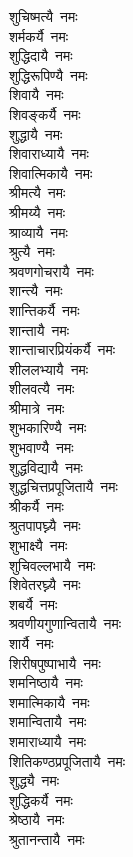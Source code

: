 \begin{flushleft}
\begin{multicols}{2}
शुचिष्मत्यै~नमः\hfill{}\\
शर्मकर्यै~नमः\\
शुद्धिदायै~नमः\\
शुद्धिरूपिण्यै~नमः\\
शिवायै~नमः\\
शिवङ्कर्यै~नमः\\
शुद्धायै~नमः\\
शिवाराध्यायै~नमः\\
शिवात्मिकायै~नमः\\
श्रीमत्यै~नमः\\
श्रीमय्यै~नमः\hfill{}\\
श्राव्यायै~नमः\\
श्रुत्यै~नमः\\
श्रवणगोचरायै~नमः\\
शान्त्यै~नमः\\
शान्तिकर्यै~नमः\\
शान्तायै~नमः\\
शान्ताचारप्रियंकर्यै~नमः\\
शीललभ्यायै~नमः\\
शीलवत्यै~नमः\\
श्रीमात्रे~नमः\hfill{}\\
शुभकारिण्यै~नमः\\
शुभवाण्यै~नमः\\
शुद्धविद्यायै~नमः\\
शुद्धचित्तप्रपूजितायै~नमः\\
श्रीकर्यै~नमः\\
श्रुतपापघ्न्यै~नमः\\
शुभाक्ष्यै~नमः\\
शुचिवल्लभायै~नमः\\
शिवेतरघ्न्यै~नमः\\
शबर्यै~नमः\hfill{}\\
श्रवणीयगुणान्वितायै~नमः\\
शार्यै~नमः\\
शिरीषपुष्पाभायै~नमः\\
शमनिष्ठायै~नमः\\
शमात्मिकायै~नमः\\
शमान्वितायै~नमः\\
शमाराध्यायै~नमः\\
शितिकण्ठप्रपूजितायै~नमः\\
शुद्ध्यै~नमः\\
शुद्धिकर्यै~नमः\hfill{}\\
श्रेष्ठायै~नमः\\
श्रुतानन्तायै~नमः\\

\end{multicols}
\end{flushleft}
